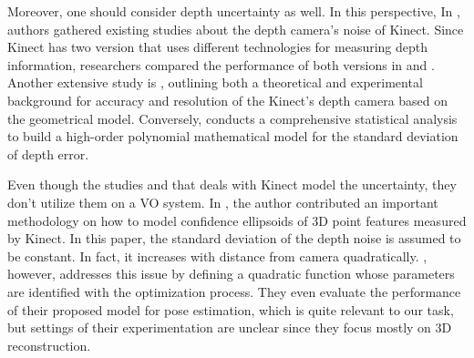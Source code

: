 \documentclass[a4paper]{report}
\numberwithin{figure}{section}
\begin{document}
Moreover, one should consider depth uncertainty as well. In this perspective,
In \parencite{Mallick2014b}, authors gathered existing studies about the depth
camera's noise of Kinect. Since Kinect has two version that uses different
technologies for measuring depth information, researchers compared the
performance of both versions in \parencite{Wasenmuller2017b} and 
\parencite{Kinect2015}.
Another extensive study is \parencite{Khoshelham2012a}, outlining both a 
theoretical
and experimental background for accuracy and resolution of the Kinect's depth
camera based on the geometrical model.  Conversely, \parencite{Choo2014} 
conducts a
comprehensive statistical analysis to build a high-order polynomial
mathematical model for the standard deviation of depth error.

Even though the studies \parencite{Park2012a} and \parencite{Nguyen2012a} that 
deals with
Kinect model the uncertainty, they don't utilize them on a VO system. In
\parencite{Park2012a}, the author contributed an important methodology on how 
to
model confidence ellipsoids of 3D point features measured by Kinect. In this
paper, the standard deviation of the depth noise is assumed to be constant.  In
fact, it increases with distance from camera quadratically. 
\parencite{Nguyen2012a},
however, addresses this issue by defining a quadratic function whose parameters
are identified with the optimization process.  They even evaluate the
performance of their proposed model for pose estimation, which is quite
relevant to our task, but settings of their experimentation are unclear since
they focus mostly on 3D reconstruction.
\end{document}
